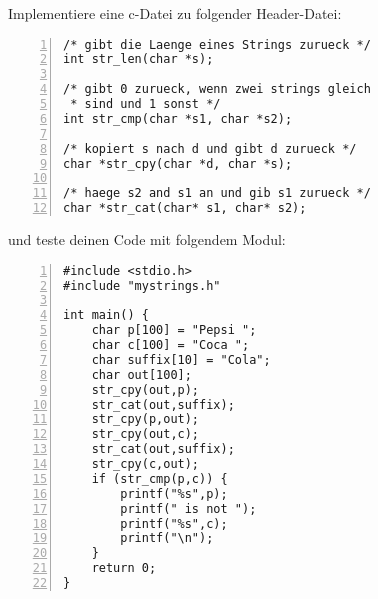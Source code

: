 \documentclass{uebungszettel}
\begin{document}






\begin{aufg} Implementiere eine c-Datei zu folgender Header-Datei: 
\begin{codelisting}
\begin{lstlisting}[numbers=left,numberstyle=\tiny,frame=tlrb]
/* gibt die Laenge eines Strings zurueck */
int str_len(char *s); 

/* gibt 0 zurueck, wenn zwei strings gleich 
 * sind und 1 sonst */
int str_cmp(char *s1, char *s2);

/* kopiert s nach d und gibt d zurueck */
char *str_cpy(char *d, char *s);

/* haege s2 and s1 an und gib s1 zurueck */ 
char *str_cat(char* s1, char* s2);
\end{lstlisting}
\end{codelisting}
und teste deinen Code mit folgendem Modul:
\begin{codelisting}
\begin{lstlisting}[numbers=left,numberstyle=\tiny,frame=tlrb]
#include <stdio.h>
#include "mystrings.h"

int main() {
	char p[100] = "Pepsi ";
	char c[100] = "Coca ";
	char suffix[10] = "Cola";
	char out[100];
	str_cpy(out,p); 
	str_cat(out,suffix); 
	str_cpy(p,out);
	str_cpy(out,c);
	str_cat(out,suffix);
	str_cpy(c,out);
	if (str_cmp(p,c)) {
		printf("%s",p);
		printf(" is not ");
		printf("%s",c);
		printf("\n");
	}
	return 0;
}
\end{lstlisting}
\end{codelisting}
\end{aufg}
\end{document}

